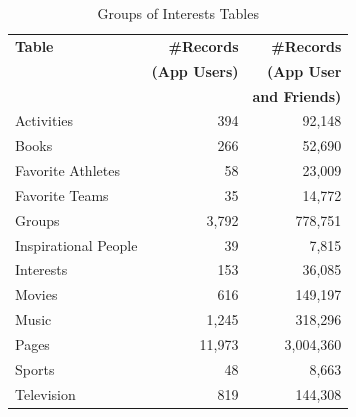 \begin{table}
\centering
\caption{\small Groups of Interests Tables}
\label{tab:interests}
\begin{tabular}{|>{\small}p{2cm}|>{\small}r|>{\small}r|}
\hline
\textbf{Table} & \textbf{\#Records} & \textbf{\#Records} \\
& \textbf{(App Users)} & \textbf{(App User} \\
& & \textbf{and Friends)} \\
\hline
Activities & 394 & 92,148 \\
\hline
Books & 266 & 52,690 \\
\hline
Favorite Athletes & 58 & 23,009 \\
\hline
Favorite Teams & 35 & 14,772 \\
\hline
Groups & 3,792 & 778,751 \\
\hline
Inspirational People & 39 & 7,815 \\
\hline
Interests & 153 & 36,085 \\
\hline
Movies & 616 & 149,197 \\
\hline
Music & 1,245 & 318,296 \\
\hline
Pages & 11,973 & 3,004,360 \\
\hline
Sports & 48 & 8,663 \\
\hline
Television & 819 & 144,308 \\
\hline
\end{tabular}
\end{table}





